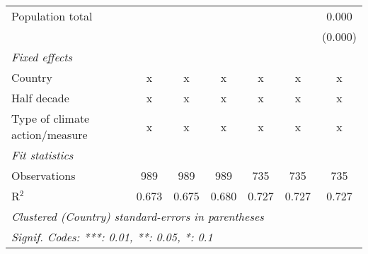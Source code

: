 \begin{tabular}{lcccccc}
   Population total                                                   &         &               &                &                &                & 0.000\\   
                                                                      &         &               &                &                &                & (0.000)\\   
   \emph{Fixed effects}\\
   Country                                                            & x       & x             & x              & x              & x              & x\\  
   Half decade                                                        & x       & x             & x              & x              & x              & x\\  
   Type of climate action/measure                                     & x       & x             & x              & x              & x              & x\\  
   \midrule \emph{Fit statistics}\\
   Observations                                                       & 989     & 989           & 989            & 735            & 735            & 735\\  
   R$^2$                                                              & 0.673   & 0.675         & 0.680          & 0.727          & 0.727          & 0.727\\  
   \midrule
   \multicolumn{7}{l}{\emph{Clustered (Country) standard-errors in parentheses}}\\
   \multicolumn{7}{l}{\emph{Signif. Codes: ***: 0.01, **: 0.05, *: 0.1}}\\
\end{tabular}
\par\endgroup


